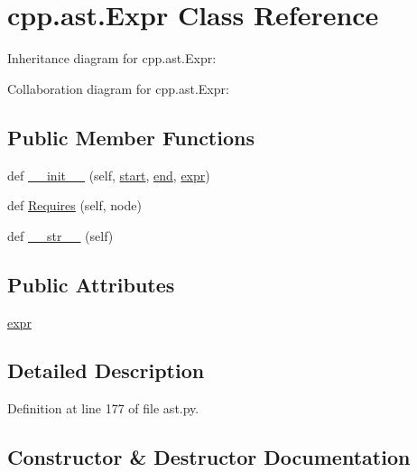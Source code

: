 \hypertarget{classcpp_1_1ast_1_1_expr}{}\section{cpp.\+ast.\+Expr Class Reference}
\label{classcpp_1_1ast_1_1_expr}


Inheritance diagram for cpp.\+ast.\+Expr\+:


Collaboration diagram for cpp.\+ast.\+Expr\+:
\subsection*{Public Member Functions}
\begin{DoxyCompactItemize}
\item 
def \hyperlink{classcpp_1_1ast_1_1_expr_adc83f4b17d6e28a39781678692eb25aa}{\+\_\+\+\_\+init\+\_\+\+\_\+} (self, \hyperlink{classcpp_1_1ast_1_1_node_a7b2aa97e6a049bb1a93aea48c48f1f44}{start}, \hyperlink{classcpp_1_1ast_1_1_node_a3c5e5246ccf619df28eca02e29d69647}{end}, \hyperlink{classcpp_1_1ast_1_1_expr_a2f4e13fb0176f2616f8703103c806462}{expr})
\item 
def \hyperlink{classcpp_1_1ast_1_1_expr_a9c92416eb1285068f190dcda8fd33682}{Requires} (self, node)
\item 
def \hyperlink{classcpp_1_1ast_1_1_expr_a7ee1896fbfa7819adbd0b2f89d11ecec}{\+\_\+\+\_\+str\+\_\+\+\_\+} (self)
\end{DoxyCompactItemize}
\subsection*{Public Attributes}
\begin{DoxyCompactItemize}
\item 
\hyperlink{classcpp_1_1ast_1_1_expr_a2f4e13fb0176f2616f8703103c806462}{expr}
\end{DoxyCompactItemize}


\subsection{Detailed Description}


Definition at line 177 of file ast.\+py.



\subsection{Constructor \& Destructor Documentation}
